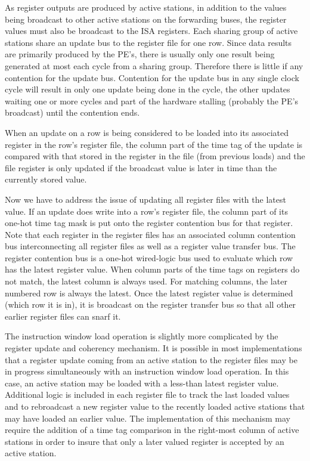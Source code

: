 \documentclass[10pt,dvips]{article}
\begin{document}
As register outputs are produced by active stations, in addition
to the values being broadcast to other active
stations on the forwarding buses,
the register values must also be broadcast to the ISA registers.
Each sharing group of active stations share an update bus to the register
file for one row.  Since data results are primarily produced by the PE's,
there is usually only one result being generated at most each cycle from
a sharing group. Therefore there is little if any contention for the
update bus.  Contention for the update bus
in any single clock cycle will result in only one update being
done in the cycle, the other updates waiting one or more cycles and
part of the hardware stalling (probably the PE's broadcast) until the
contention ends.

When an update on a row is being considered to be loaded into its associated 
register
in the row's register file, the column part of the time tag of the 
update is compared with that stored in the register in the file (from previous loads)
and the file register is only updated if the broadcast value
is later in time than the
currently stored value.

Now we have to
address the issue of updating all register files with the latest
value.
If an update does write into a row's register file, the column part
of its one-hot time tag mask is put onto the register contention
bus for that register.  Note that each register in the register
files has an associated column contention bus interconnecting
all register files as well as a register value transfer bus.
The register contention bus is a one-hot wired-logic bus
used to evaluate which row has the latest register value.
When column parts of the time tags on registers do not match,
the latest column is always used.
For matching columns, the later numbered row is always the latest.
Once the latest register value is determined (which row it is in), it 
is broadcast on the register transfer bus so that all other earlier
register files can snarf it.

The instruction window load operation is slightly more complicated
by the register update and coherency mechanism.  It is possible
in most implementations that a register update coming from an active
station to the register files may be in progress simultaneously
with an instruction window load operation.  
In this case, an active station
may be loaded with a less-than latest register value.  Additional
logic is included in each register file to track the last
loaded values and to rebroadcast a new register value to the
recently loaded active stations that may have loaded an earlier value.
The implementation of this mechanism may require the addition
of a time tag comparison in the right-most column of active
stations in order to insure that only a later valued register
is accepted by an active station.
\end{document}
